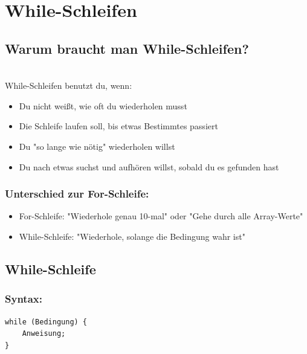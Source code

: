 \newpage


\section*{While-Schleifen}

\subsection*{Warum braucht man While-Schleifen?}\\
While-Schleifen benutzt du, wenn:
\begin{itemize}
	\item Du nicht weißt, wie oft du wiederholen musst
	\item Die Schleife laufen soll, bis etwas Bestimmtes passiert
	\item Du "so lange wie nötig" wiederholen willst
	\item Du nach etwas suchst und aufhören willst, sobald du es gefunden hast
\end{itemize}

\subsubsection*{Unterschied zur For-Schleife:}
\begin{itemize}
	\item For-Schleife: "Wiederhole genau 10-mal" oder "Gehe durch alle Array-Werte"
	\item While-Schleife: "Wiederhole, solange die Bedingung wahr ist"
\end{itemize}

\newpage


\subsection*{While-Schleife}

\subsubsection*{Syntax:}
\begin{lstlisting}
while (Bedingung) {
    Anweisung;
}
\end{lstlisting}

